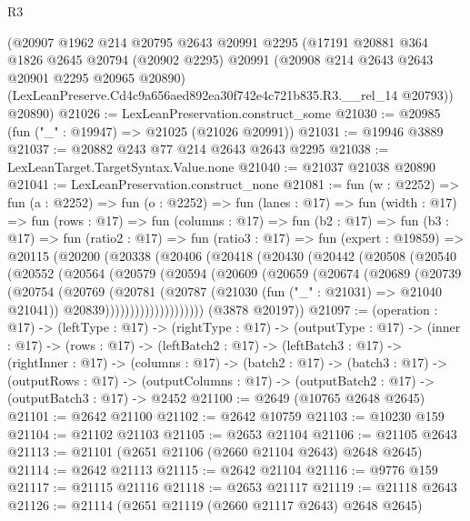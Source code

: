 \begin{lexlean}{R3}
\begin{coremodule}
    (@20907
      @1962
      @214
      @20795
      @2643
      @20991
      @2295
      (@17191
        @20881
        @364
        @1826
        @2645
        @20794
        (@20902 @2295)
        @20991
        (@20908 @214 @2643 @2643 @20901 @2295 @20965 @20890)
        (LexLeanPreserve.Cd4c9a656aed892ea30f742e4c721b835.R3.__rel_14 @20793))
      @20890)
@21026 := LexLeanPreservation.construct_some
@21030 := @20985 (fun ("_" : @19947) => @21025 (@21026 @20991))
@21031 := @19946 @3889
@21037 := @20882 @243 @77 @214 @2643 @2643 @2295
@21038 := LexLeanTarget.TargetSyntax.Value.none
@21040 := @21037 @21038 @20890
@21041 := LexLeanPreservation.construct_none
@21081 := fun (w : @2252) =>
  fun (a : @2252) =>
  fun (o : @2252) =>
  fun (lanes : @17) =>
  fun (width : @17) =>
  fun (rows : @17) =>
  fun (columns : @17) =>
  fun (b2 : @17) =>
  fun (b3 : @17) =>
  fun (ratio2 : @17) =>
  fun (ratio3 : @17) =>
  fun (expert : @19859) =>
  @20115
    (@20200
      (@20338
        (@20406
          (@20418
            (@20430
              (@20442
                (@20508
                  (@20540
                    (@20552
                      (@20564
                        (@20579
                          (@20594
                            (@20609
                              (@20659
                                (@20674
                                  (@20689
                                    (@20739
                                      (@20754
                                        (@20769
                                          (@20781
                                            (@20787
                                              (@21030 (fun ("_" : @21031) => @21040 @21041))
                                              @20839))))))))))))))))))))
      (@3878 @20197))
@21097 := (operation : @17) ->
  (leftType : @17) ->
  (rightType : @17) ->
  (outputType : @17) ->
  (inner : @17) ->
  (rows : @17) ->
  (leftBatch2 : @17) ->
  (leftBatch3 : @17) ->
  (rightInner : @17) ->
  (columns : @17) ->
  (batch2 : @17) ->
  (batch3 : @17) ->
  (outputRows : @17) ->
  (outputColumns : @17) -> (outputBatch2 : @17) -> (outputBatch3 : @17) -> @2452
@21100 := @2649 (@10765 @2648 @2645)
@21101 := @2642 @21100
@21102 := @2642 @10759
@21103 := @10230 @159
@21104 := @21102 @21103
@21105 := @2653 @21104
@21106 := @21105 @2643
@21113 := @21101 (@2651 @21106 (@2660 @21104 @2643) @2648 @2645)
@21114 := @2642 @21113
@21115 := @2642 @21104
@21116 := @9776 @159
@21117 := @21115 @21116
@21118 := @2653 @21117
@21119 := @21118 @2643
@21126 := @21114 (@2651 @21119 (@2660 @21117 @2643) @2648 @2645)

\end{coremodule}
\end{lexlean}
